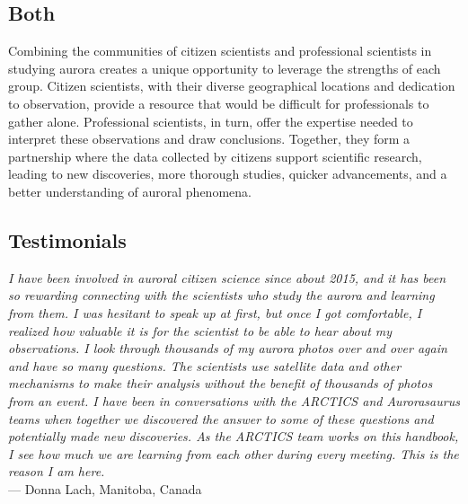 \documentclass{article}
\begin{document}
\subsection{Both}
Combining the communities of citizen scientists and professional scientists in studying aurora creates a unique opportunity to leverage the strengths of each group. Citizen scientists, with their diverse geographical locations and dedication to observation, provide a resource that would be difficult for professionals to gather alone. Professional scientists, in turn, offer the expertise needed to interpret these observations and draw conclusions. Together, they form a partnership where the data collected by citizens support scientific research, leading to new discoveries, more thorough studies, quicker advancements, and a better understanding of auroral phenomena.


\subsection{Testimonials}

\textit{I have been involved in auroral citizen science since about 2015, and it has been so rewarding connecting with the scientists who study the aurora and learning from them. I was hesitant to speak up at first, but once I got comfortable, I realized how valuable it is for the scientist to be able to hear about my observations. I look through thousands of my aurora photos over and over again and have so many questions. The scientists use satellite data and other mechanisms to make their analysis without the benefit of thousands of photos from an event. I have been in conversations with the ARCTICS and Aurorasaurus teams when together we discovered the answer to some of these questions and potentially made new discoveries. As the ARCTICS team works on this handbook, I see how much we are learning from each other during every meeting. This is the reason I am here.
}\\
--- Donna Lach, Manitoba, Canada\\
\end{document}
